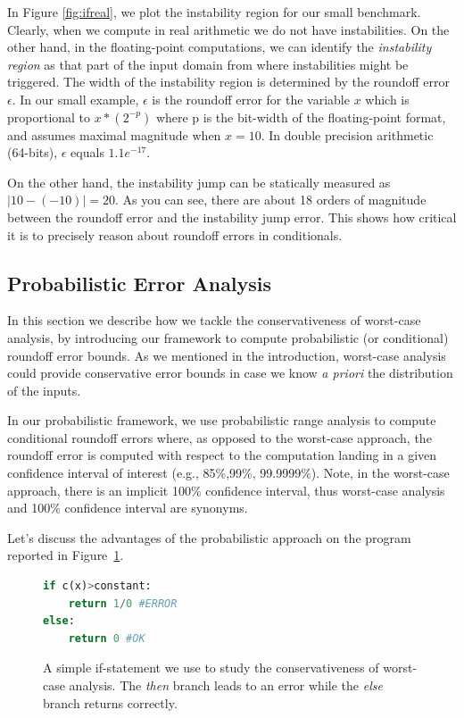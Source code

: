 In Figure \ref{fig:ifreal}, we plot the instability region for our small benchmark. Clearly, when we compute in real arithmetic we do not have instabilities. On the other hand, in the floating-point computations, we can identify the \emph{instability region} as that part of the input domain from where instabilities might be triggered.
%
The width of the instability region is determined by the roundoff error $\epsilon$.
%
In our small example, $\epsilon$ is the roundoff error for the variable $x$ which is proportional to $x*(2^{-p})$ where p is the bit-width of the floating-point format, and assumes maximal magnitude when $x=10$.  
%
In double precision arithmetic (64-bits), $\epsilon$ equals $1.1e^{-17}$.
%

On the other hand, the instability jump can be statically measured as $|10-(-10)|=20$. As you can see, there are about 18 orders of magnitude between the roundoff error and the instability jump error.
%
This shows how critical it is to precisely reason about roundoff errors in conditionals.
 
\subsection{Probabilistic Error Analysis}
\label{sec:prob}
%
In this section we describe how we tackle the conservativeness of worst-case analysis, by introducing our framework to compute probabilistic (or conditional) roundoff error bounds.
%
As we mentioned in the introduction, worst-case analysis could provide conservative error bounds in case we know \emph{a priori} the distribution of the inputs. 
%
%

In our probabilistic framework, we use probabilistic range analysis to compute conditional roundoff errors where, as opposed to the worst-case approach, the roundoff error is computed with respect to the computation landing in a given confidence interval of interest (e.g., 85\%,99\%, 99.9999\%).
%
Note, in the worst-case approach, there is an implicit 100\% confidence interval, thus worst-case analysis and 100\% confidence interval are synonyms.
%

%
Let's discuss the advantages of the probabilistic approach on the program reported in Figure~\ref{fig:prob}.
%
\begin{figure}[h!]
	\begin{lstlisting}[frame=single, language=Python]
if c(x)>constant:
	return 1/0 #ERROR
else:
	return 0 #OK
	\end{lstlisting}
	\caption{A simple if-statement we use to study the conservativeness of worst-case analysis. The \emph{then} branch leads to an error while the \emph{else} branch returns correctly.}
	\label{fig:prob}
\end{figure}
%

